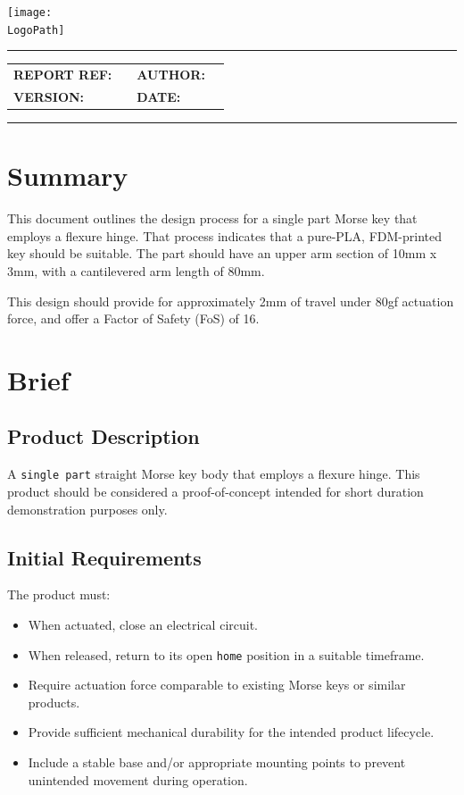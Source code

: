 \documentclass[10pt]{article}
\makeatletter
\newcommand{\customtitle}{%
  \noindent
  \begin{minipage}[t]{0.65\textwidth}
    \vspace{-0.5cm}
    {\ocrfamily\Large\bfseries \DocumentType \par}
  \end{minipage}%
  \begin{minipage}[t]{0.35\textwidth}
    \flushright{}
    \texttt{[image: \\LogoPath]}
  \end{minipage}

  \vspace{0.3cm}
  \hrule height 0.8pt
  \vspace{0.3cm}

  {\ocrfamily\bfseries\ProjectFullRef\par}
  {\ocrfamily\large\bfseries\ReportTitle\par}

  \vspace{0.5em}

  \begin{tabular}{@{}ll@{\hspace{2cm}}ll@{}}
    \ocrfamily\textbf{REPORT REF:} & \ocrfamily \ReportRef &
    \ocrfamily\textbf{AUTHOR:}     & \ocrfamily \AuthorName \\

    \ocrfamily\textbf{VERSION:}    & \ocrfamily \DocVersion &
    \ocrfamily\textbf{DATE:}       & \ocrfamily \ReleaseDate \\
  \end{tabular}

  \vspace{0.3cm}
  \hrule height 0.8pt
  \vspace{0.25cm}
}
\makeatother
\begin{document}
\vspace*{-1cm}
\thispagestyle{plain}
\customtitle{}


\section{Summary}

This document outlines the design process for a single part Morse key that employs a flexure hinge.
That process indicates that a pure-PLA, FDM-printed key should be suitable. The part should have an
upper arm section of 10mm x 3mm, with a cantilevered arm length of 80mm.

This design should provide for approximately 2mm of travel under 80gf actuation force, and offer a
Factor of Safety (FoS) of 16.

\section{Brief}
\subsection{Product Description}
A \texttt{single part} straight Morse key body that employs a flexure hinge. This product should be
considered a proof-of-concept intended for short duration demonstration purposes only.

\subsection{Initial Requirements}
The product must:
\begin{itemize}[leftmargin=*]
	\item When actuated, close an electrical circuit.
	\item When released, return to its open \texttt{home} position in a suitable timeframe.
	\item Require actuation force comparable to existing Morse keys or similar products.
	\item Provide sufficient mechanical durability for the intended product lifecycle.
	\item Include a stable base and/or appropriate mounting points to prevent unintended movement during
	      operation.
\end{itemize}
\end{document}
